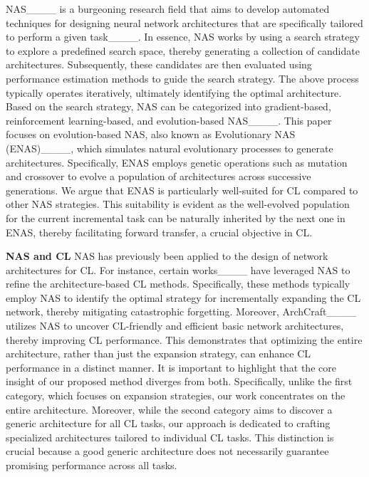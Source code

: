 NAS____ is a burgeoning research field that aims to develop automated techniques for designing neural network architectures that are specifically tailored to perform a given task____. In essence, NAS works by using a search strategy to explore a predefined search space, thereby generating a collection of candidate architectures. Subsequently, these candidates are then evaluated using performance estimation methods to guide the search strategy. The above process typically operates iteratively, ultimately identifying the optimal architecture. Based on the search strategy, NAS can be categorized into gradient-based, reinforcement learning-based, and evolution-based NAS____. This paper focuses on evolution-based NAS, also known as Evolutionary NAS (ENAS)____, which simulates natural evolutionary processes to generate architectures. Specifically, ENAS employs genetic operations such as mutation and crossover to evolve a population of architectures across successive generations. We argue that ENAS is particularly well-suited for CL compared to other NAS strategies. This suitability is evident as the well-evolved population for the current incremental task can be naturally inherited by the next one in ENAS, thereby facilitating forward transfer, a crucial objective in CL.

\textbf{NAS and CL}
NAS has previously been applied to the design of network architectures for CL. For instance, certain works____ have leveraged NAS to refine the architecture-based CL methods. Specifically, these methods typically employ NAS to identify the optimal strategy for incrementally expanding the CL network, thereby mitigating catastrophic forgetting. Moreover, ArchCraft____ utilizes NAS to uncover CL-friendly and efficient basic network architectures, thereby improving CL performance. This demonstrates that optimizing the entire architecture, rather than just the expansion strategy, can enhance CL performance in a distinct manner. It is important to highlight that the core insight of our proposed method diverges from both. Specifically, unlike the first category, which focuses on expansion strategies, our work concentrates on the entire architecture. Moreover, while the second category aims to discover a generic architecture for all CL tasks, our approach is dedicated to crafting specialized architectures tailored to individual CL tasks. This distinction is crucial because a good generic architecture does not necessarily guarantee promising performance across all tasks.